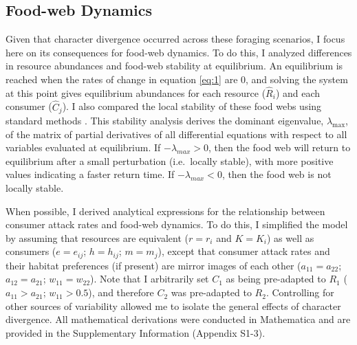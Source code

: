 \documentclass[11pt,]{article}
\begin{document}
\subsection{Food-web Dynamics}\label{food-web-dynamics}

Given that character divergence occurred across these foraging
scenarios, I focus here on its consequences for food-web dynamics. To do
this, I analyzed differences in resource abundances and food-web
stability at equilibrium. An equilibrium is reached when the rates of
change in equation \ref{eq:1} are 0, and solving the system at this
point gives equilibrium abundances for each resource (\(\hat R_i\)) and
each consumer (\(\hat C_j\)). I also compared the local stability of
these food webs using standard methods \citep{Otto2007}. This stability
analysis derives the dominant eigenvalue, \(\lambda_{\text{max}}\), of
the matrix of partial derivatives of all differential equations with
respect to all variables evaluated at equilibrium. If
\(-\lambda_{max}>0\), then the food web will return to equilibrium after
a small perturbation (i.e.~locally stable), with more positive values
indicating a faster return time. If \(-\lambda_{max}<0\), then the food
web is not locally stable.

When possible, I derived analytical expressions for the relationship
between consumer attack rates and food-web dynamics. To do this, I
simplified the model by assuming that resources are equivalent
(\(r=r_i\) and \(K=K_i\)) as well as consumers (\(e=e_{ij}\);
\(h=h_{ij}\); \(m=m_j\)), except that consumer attack rates and their
habitat preferences (if present) are mirror images of each other
(\(a_{11}=a_{22}\); \(a_{12}=a_{21}\); \(w_{11}=w_{22}\)). Note that I
arbitrarily set \(C_1\) as being pre-adapted to \(R_1\)
(\(a_{11} > a_{21}\); \(w_{11} > 0.5\)), and therefore \(C_2\) was
pre-adapted to \(R_2\). Controlling for other sources of variability
allowed me to isolate the general effects of character divergence. All
mathematical derivations were conducted in Mathematica
\citep{Mathematica} and are provided in the Supplementary Information
(Appendix S1-3).
\end{document}
